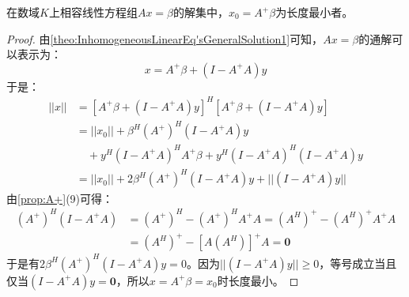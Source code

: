 \begin{theorem}
	在数域$K$上相容线性方程组$Ax=\beta$的解集中，$x_0=A^+\beta$为长度最小者。
\end{theorem}
\begin{proof}
	由\cref{theo:InhomogeneousLinearEq'sGeneralSolution1}可知，$Ax=\beta$的通解可以表示为：
	\begin{equation*}
		x=A^+\beta+(I-A^+A)y
	\end{equation*}
	于是：
	\begin{align*}
		||x||
		&=[A^+\beta+(I-A^+A)y]^H[A^+\beta+(I-A^+A)y] \\
		&=||x_0||+\beta^H(A^+)^H(I-A^+A)y \\
		&\quad+y^H(I-A^+A)^HA^+\beta+y^H(I-A^+A)^H(I-A^+A)y \\
		&=||x_0||+2\beta^H(A^+)^H(I-A^+A)y+||(I-A^+A)y||
	\end{align*}
	由\cref{prop:A+}(9)可得：
	\begin{align*}
		(A^+)^H(I-A^+A)
		&=(A^+)^H-(A^+)^HA^+A=(A^H)^+-(A^H)^+A^+A \\
		&=(A^H)^+-[A(A^H)]^+A=\mathbf{0}
	\end{align*}
	于是有$2\beta^H(A^+)^H(I-A^+A)y=0$。因为$||(I-A^+A)y||\geqslant0$，等号成立当且仅当$(I-A^+A)y=\mathbf{0}$，所以$x=A^+\beta=x_0$时长度最小。
\end{proof}